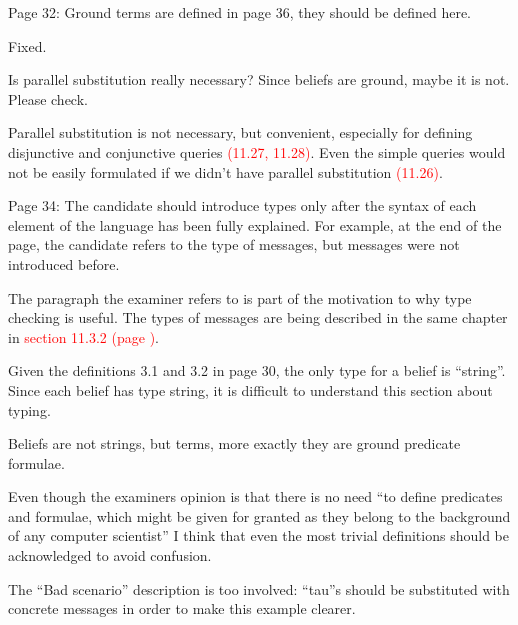 \documentclass{article}
\newcommand*\R[1]{\textcolor{red}{#1}} %
\newcommand{\todo}[1]{[\textcolor{green}{TODO}: #1]}
\newenvironment{them}{\noindent\begingroup\color{blue}}{\endgroup\par}
\begin{document}
\begin{them}

Page 32:
Ground terms are defined in page 36, they should be defined here.
\end{them}
Fixed.

\begin{them}

Is parallel substitution really necessary? Since beliefs are ground, maybe it
is not. Please check.

\end{them}
Parallel substitution is not necessary, but convenient, especially for defining
disjunctive and conjunctive queries \R{(11.27, 11.28)}. Even the simple queries
would not be easily formulated if we didn't have parallel substitution \R{(11.26)}.

\begin{them}

Page 34:
The candidate should introduce types only after the syntax of each element of
the language has been fully explained. For example, at the end of the page, the
candidate refers to the type of messages, but messages were not introduced
before.

\end{them}
The paragraph the examiner refers to is part of the motivation to why type
checking is useful. The types of messages are being described in the same
chapter in \R{section 11.3.2 (page )}.

\begin{them}

Given the definitions 3.1 and 3.2 in page 30, the only type for a belief is
``string''. Since each belief has type string, it is difficult to understand this
section about typing.

\end{them}
Beliefs are not strings, but terms, more exactly they are ground predicate
formulae.

Even though the examiners opinion is that there is no need ``to define
predicates and formulae, which might be given for granted as they belong to the
background of any computer scientist'' I think that even the most trivial
definitions should be acknowledged to avoid confusion. 

\begin{them}

The ``Bad scenario'' description is too involved: ``tau''s should be substituted
with concrete messages in order to make this example clearer.

\end{them}
\todo{}
\end{document}
